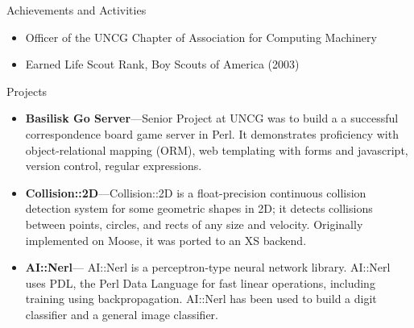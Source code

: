 \documentclass[11pt,oneside]{article}
\newenvironment{ressection}[1]{
	\vspace{2pt}
	{\fontfamily{phv}\selectfont\Large#1}
	\begin{itemize}
	\vspace{3pt}
}{
	\end{itemize}
}
\newcommand{\resitem}[1]{
	\vspace{-4pt}
	\item \begin{flushleft} #1 \end{flushleft}
}
\newcommand{\ressubitem}[1]{
	\vspace{-1pt}
	\item \begin{flushleft} #1 \end{flushleft}
}
\newcommand{\resbigitem}[3]{
	\vspace{-5pt}
	\item
	\textbf{#1}---#2 \\
	\textit{#3}
}
\newenvironment{ressubsec}[3]{
	\resbigitem{#1}{#2}{#3}
	\vspace{-2pt}
	\begin{itemize}
}{
	\end{itemize}
}
\begin{document}
\begin{ressection}{Achievements and Activities}

	\resitem{Officer of the UNCG Chapter of Association for Computing Machinery}

	\resitem{Earned Life Scout Rank, Boy Scouts of America (2003)}


\end{ressection}


\begin{ressection}{Projects}

	\begin{ressubsec}{Basilisk Go Server}{Senior Project at UNCG was to build a a successful correspondence
         board game server in Perl. It demonstrates proficiency with object-relational mapping (ORM),
         web templating with forms and javascript, version control, regular expressions.}{}
	\end{ressubsec}
	\begin{ressubsec}{Collision::2D}{Collision::2D is a float-precision continuous collision detection
      system for some geometric shapes in 2D; it detects collisions between
      points, circles, and rects of any size and velocity.
      Originally implemented on Moose, it was ported to an XS backend.}{}
	\end{ressubsec}
	\begin{ressubsec}{AI::Nerl}{
      AI::Nerl is a perceptron-type neural network library. AI::Nerl uses PDL, the Perl Data
      Language for fast linear operations, including training using backpropagation.
      AI::Nerl has been used to build a digit classifier and a general image classifier.
      }{}
	\end{ressubsec}

\end{ressection}
\end{document}
